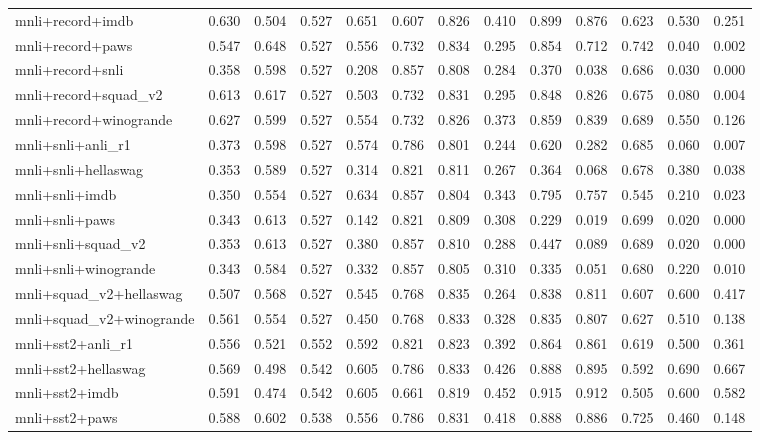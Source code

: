 \begin{table}[t]
\begin{tabular}{lrrrrrrrrrrrr}
    mnli+record+imdb & 0.630 & 0.504 & 0.527 & 0.651 & 0.607 & 0.826 & 0.410 & 0.899 & 0.876 & 0.623 & 0.530 & 0.251 \\
    mnli+record+paws & 0.547 & 0.648 & 0.527 & 0.556 & 0.732 & 0.834 & 0.295 & 0.854 & 0.712 & 0.742 & 0.040 & 0.002 \\
    mnli+record+snli & 0.358 & 0.598 & 0.527 & 0.208 & 0.857 & 0.808 & 0.284 & 0.370 & 0.038 & 0.686 & 0.030 & 0.000 \\
    mnli+record+squad\_v2 & 0.613 & 0.617 & 0.527 & 0.503 & 0.732 & 0.831 & 0.295 & 0.848 & 0.826 & 0.675 & 0.080 & 0.004 \\
    mnli+record+winogrande & 0.627 & 0.599 & 0.527 & 0.554 & 0.732 & 0.826 & 0.373 & 0.859 & 0.839 & 0.689 & 0.550 & 0.126 \\
    mnli+snli+anli\_r1 & 0.373 & 0.598 & 0.527 & 0.574 & 0.786 & 0.801 & 0.244 & 0.620 & 0.282 & 0.685 & 0.060 & 0.007 \\
    mnli+snli+hellaswag & 0.353 & 0.589 & 0.527 & 0.314 & 0.821 & 0.811 & 0.267 & 0.364 & 0.068 & 0.678 & 0.380 & 0.038 \\
    mnli+snli+imdb & 0.350 & 0.554 & 0.527 & 0.634 & 0.857 & 0.804 & 0.343 & 0.795 & 0.757 & 0.545 & 0.210 & 0.023 \\
    mnli+snli+paws & 0.343 & 0.613 & 0.527 & 0.142 & 0.821 & 0.809 & 0.308 & 0.229 & 0.019 & 0.699 & 0.020 & 0.000 \\
    mnli+snli+squad\_v2 & 0.353 & 0.613 & 0.527 & 0.380 & 0.857 & 0.810 & 0.288 & 0.447 & 0.089 & 0.689 & 0.020 & 0.000 \\
    mnli+snli+winogrande & 0.343 & 0.584 & 0.527 & 0.332 & 0.857 & 0.805 & 0.310 & 0.335 & 0.051 & 0.680 & 0.220 & 0.010 \\
    mnli+squad\_v2+hellaswag & 0.507 & 0.568 & 0.527 & 0.545 & 0.768 & 0.835 & 0.264 & 0.838 & 0.811 & 0.607 & 0.600 & 0.417 \\
    mnli+squad\_v2+winogrande & 0.561 & 0.554 & 0.527 & 0.450 & 0.768 & 0.833 & 0.328 & 0.835 & 0.807 & 0.627 & 0.510 & 0.138 \\
    mnli+sst2+anli\_r1 & 0.556 & 0.521 & 0.552 & 0.592 & 0.821 & 0.823 & 0.392 & 0.864 & 0.861 & 0.619 & 0.500 & 0.361 \\
    mnli+sst2+hellaswag & 0.569 & 0.498 & 0.542 & 0.605 & 0.786 & 0.833 & 0.426 & 0.888 & 0.895 & 0.592 & 0.690 & 0.667 \\
    mnli+sst2+imdb & 0.591 & 0.474 & 0.542 & 0.605 & 0.661 & 0.819 & 0.452 & 0.915 & 0.912 & 0.505 & 0.600 & 0.582 \\
    mnli+sst2+paws & 0.588 & 0.602 & 0.538 & 0.556 & 0.786 & 0.831 & 0.418 & 0.888 & 0.886 & 0.725 & 0.460 & 0.148 \\

\end{tabular}
\end{table}
